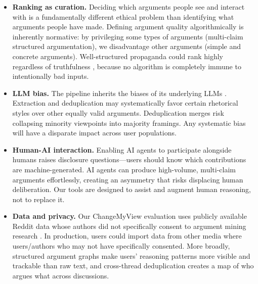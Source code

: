 
\begin{itemize}[leftmargin=*,nosep]

\item \textbf{Ranking as curation.} Deciding which arguments people see and interact with is a fundamentally different ethical problem than identifying what arguments people have made. Defining argument quality algorithmically is inherently normative: by privileging some types of arguments (multi-claim structured argumentation), we disadvantage other arguments (simple and concrete arguments). Well-structured propaganda could rank highly regardless of truthfulness \citep{verma-etal-2025-reasoning-rhetoric}, because no algorithm is completely immune to intentionally bad inputs.

\item \textbf{LLM bias.} The pipeline inherits the biases of its underlying LLMs \citep{bender-etal-2021-stochastic-parrots}. Extraction and deduplication may systematically favor certain rhetorical styles over other equally valid arguments. Deduplication merges risk collapsing minority viewpoints into majority framings. Any systematic bias will have a disparate impact across user populations.

\item \textbf{Human-AI interaction.} Enabling AI agents to participate alongside humans raises disclosure questions---users should know which contributions are machine-generated. AI agents can produce high-volume, multi-claim arguments effortlessly, creating an asymmetry that risks displacing human deliberation. Our tools are designed to assist and augment human reasoning, not to replace it.

\item \textbf{Data and privacy.} Our ChangeMyView evaluation uses publicly available Reddit data whose authors did not specifically consent to argument mining research \citep{gliniecka-2023-situated-ethics-reddit}. In production, users could import data from other media where users/authors who may not have specifically consented. More broadly, structured argument graphs make users' reasoning patterns more visible and trackable than raw text, and cross-thread deduplication creates a map of who argues what across discussions.


\end{itemize}
